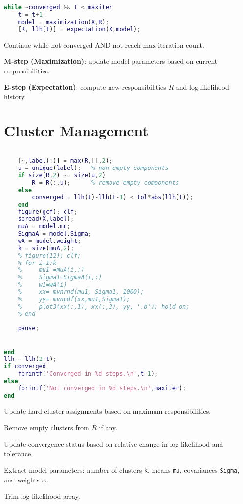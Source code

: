 \documentclass[11pt]{article}
\begin{document}
\begin{minipage}{\textwidth}
\begin{minipage}[t]{0.48\textwidth}
\begin{lstlisting}[language=Matlab, firstnumber=17]
while ~converged && t < maxiter
    t = t+1;
    model = maximization(X,R);
    [R, llh(t)] = expectation(X,model);
\end{lstlisting}
\end{minipage}
\hfill
\begin{minipage}[t]{0.48\textwidth}
Continue while not converged AND not reach max iteration count.

\textbf{M-step (Maximization)}: update model parameters based on current responsibilities.

\textbf{E-step (Expectation)}: compute new responsibilities $R$ and log-likelihood history.
\end{minipage}
\end{minipage}

\vspace{0.5cm}

\section{Cluster Management}

\begin{minipage}{\textwidth}
\begin{minipage}[t]{0.48\textwidth}
\begin{lstlisting}[language=Matlab, firstnumber=21]

    [~,label(:)] = max(R,[],2);
    u = unique(label);   % non-empty components
    if size(R,2) ~= size(u,2)
        R = R(:,u);      % remove empty components
    else
        converged = llh(t)-llh(t-1) < tol*abs(llh(t));
    end
    figure(gcf); clf;
    spread(X,label);
    muA = model.mu;
    SigmaA = model.Sigma;
    wA = model.weight;
    k = size(muA,2);
    % figure(12); clf;
    % for i=1:k
    %     mu1 =muA(i,:)
    %     Sigma1=SigmaA(i,:)
    %     w1=wA(i)
    %     xx= mvnrnd(mu1, Sigma1, 1000);
    %     yy= mvnpdf(xx,mu1,Sigma1);
    %     plot3(xx(:,1), xx(:,2), yy, '.b'); hold on; 
    % end
    
    pause;


end
llh = llh(2:t);
if converged
    fprintf('Converged in %d steps.\n',t-1);
else
    fprintf('Not converged in %d steps.\n',maxiter);
end
\end{lstlisting}
\end{minipage}
\hfill
\begin{minipage}[t]{0.48\textwidth}
Update hard cluster assignments based on maximum responsibilities.

Remove empty clusters from $R$ if any.

Update convergence status based on relative change in log-likelihood and tolerance.

Extract model parameters: number of clusters \texttt{k}, means \texttt{mu}, covariances \texttt{Sigma}, and weights \textbf{$w$}.

Trim log-likelihood array.
\end{minipage}
\end{minipage}
\end{document}
